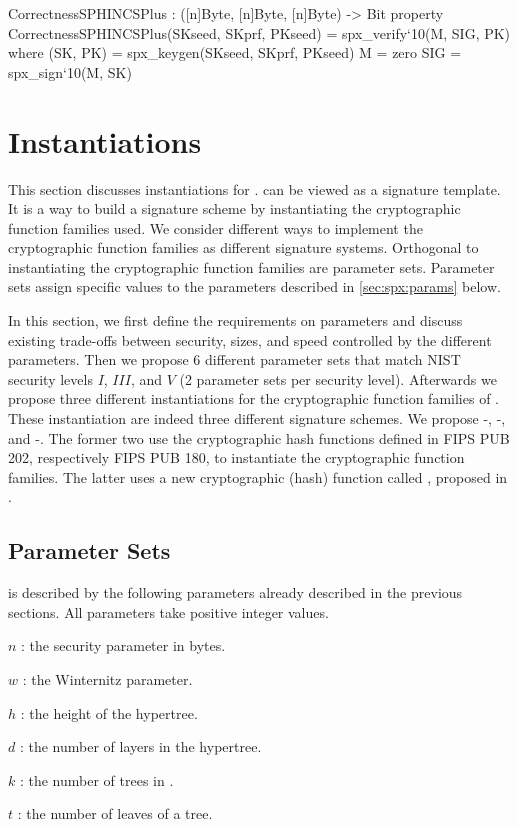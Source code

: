 \begin{code}
  CorrectnessSPHINCSPlus : ([n]Byte, [n]Byte, [n]Byte) -> Bit
  property CorrectnessSPHINCSPlus(SKseed, SKprf, PKseed) = spx_verify`{10}(M, SIG, PK)
    where
      (SK, PK) = spx_keygen(SKseed, SKprf, PKseed)
      M = zero
      SIG = spx_sign`{10}(M, SK)
\end{code}

\section{Instantiations}
\label{sec:instantiations}

This section discusses instantiations for \spx. \spx can be 
viewed as a signature template. It is a way to build a signature 
scheme by instantiating the cryptographic function families used. We consider
different ways to implement the cryptographic function families as 
different signature systems. Orthogonal to instantiating the cryptographic 
function families are parameter sets. Parameter sets
assign  specific values to the \spx parameters described in \autoref{sec:spx:params} below. 

In this section, we first define the requirements on parameters and discuss 
existing trade-offs between 
security, sizes, and speed controlled by the different parameters. Then we 
propose 6 different parameter sets that match NIST security levels $I$, 
$III$, and $V$ (2 parameter sets per security level). Afterwards we propose 
three different instantiations for the cryptographic function families of \spx. 
These instantiation are indeed three different signature schemes. We propose 
\spx-\shathree, \spx-\shatwo, and \spx-\haraka. The 
former two use the cryptographic hash functions defined in FIPS PUB 202, 
respectively FIPS PUB 180, to instantiate the cryptographic function families. 
The latter uses a new cryptographic (hash) function called \haraka, proposed in
\cite{articleToSC563}. 

\subsection{\spx Parameter Sets}\label{sec:spx:params}
\spx is described by the following parameters already described in the previous 
sections. All parameters take positive integer values.
\begin{description}
 \item  $n$ : the security parameter in bytes.
 \item  $w$ : the Winternitz parameter.
 \item  $h$ : the height of the hypertree.
 \item  $d$ : the number of layers in the hypertree.
 \item  $k$ : the number of trees in \fors.
 \item  $t$ : the number of leaves of a \fors tree.
\end{description}

